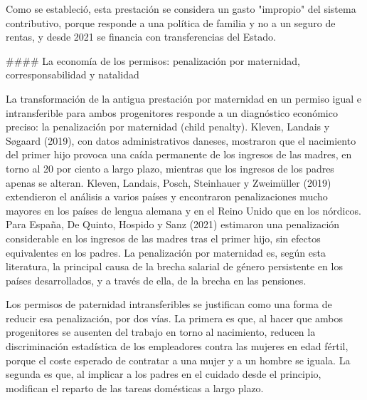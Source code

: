 \documentclass[10pt,a4paper]{article}
\begin{document}
Como se estableció, esta prestación se considera un gasto "impropio" del sistema contributivo, porque responde a una política de familia y no a un seguro de rentas, y desde 2021 se financia con transferencias del Estado.



#### La economía de los permisos: penalización por maternidad, corresponsabilidad y natalidad

La transformación de la antigua prestación por maternidad en un permiso igual e intransferible para ambos progenitores responde a un diagnóstico económico preciso: la penalización por maternidad (child penalty). Kleven, Landais y Søgaard (2019), con datos administrativos daneses, mostraron que el nacimiento del primer hijo provoca una caída permanente de los ingresos de las madres, en torno al 20 por ciento a largo plazo, mientras que los ingresos de los padres apenas se alteran. Kleven, Landais, Posch, Steinhauer y Zweimüller (2019) extendieron el análisis a varios países y encontraron penalizaciones mucho mayores en los países de lengua alemana y en el Reino Unido que en los nórdicos. Para España, De Quinto, Hospido y Sanz (2021) estimaron una penalización considerable en los ingresos de las madres tras el primer hijo, sin efectos equivalentes en los padres. La penalización por maternidad es, según esta literatura, la principal causa de la brecha salarial de género persistente en los países desarrollados, y a través de ella, de la brecha en las pensiones.

Los permisos de paternidad intransferibles se justifican como una forma de reducir esa penalización, por dos vías. La primera es que, al hacer que ambos progenitores se ausenten del trabajo en torno al nacimiento, reducen la discriminación estadística de los empleadores contra las mujeres en edad fértil, porque el coste esperado de contratar a una mujer y a un hombre se iguala. La segunda es que, al implicar a los padres en el cuidado desde el principio, modifican el reparto de las tareas domésticas a largo plazo.
\end{document}
